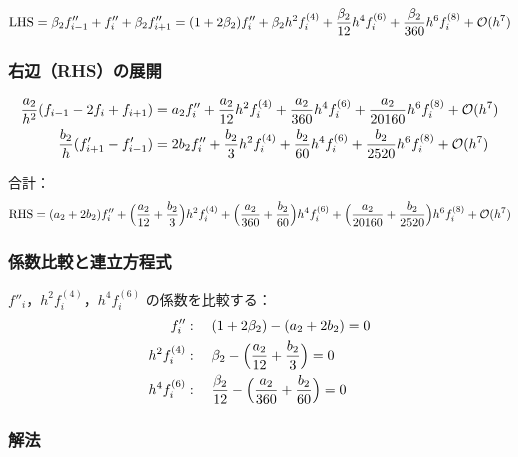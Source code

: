 \begin{equation}
  \text{LHS} = \beta_2 f''_{i-1} + f''_i + \beta_2 f''_{i+1}
  = (1+2\beta_2)f''_i + \beta_2 h^2 f^{(4)}_i
    + \frac{\beta_2}{12}h^4 f^{(6)}_i + \frac{\beta_2}{360}h^6 f^{(8)}_i + \mathcal{O}(h^7)
\end{equation}

\subsubsection*{右辺（RHS）の展開}

\begin{align}
  \frac{a_2}{h^2}(f_{i-1}-2f_i+f_{i+1})
  &= a_2 f''_i + \frac{a_2}{12}h^2 f^{(4)}_i + \frac{a_2}{360}h^4 f^{(6)}_i
     + \frac{a_2}{20160}h^6 f^{(8)}_i + \mathcal{O}(h^7) \\
  \frac{b_2}{h}(f'_{i+1}-f'_{i-1})
  &= 2b_2 f''_i + \frac{b_2}{3}h^2 f^{(4)}_i + \frac{b_2}{60}h^4 f^{(6)}_i
     + \frac{b_2}{2520}h^6 f^{(8)}_i + \mathcal{O}(h^7)
\end{align}

合計：
\begin{equation}
  \text{RHS} = (a_2+2b_2)f''_i
  + \Bigl(\frac{a_2}{12}+\frac{b_2}{3}\Bigr)h^2 f^{(4)}_i
  + \Bigl(\frac{a_2}{360}+\frac{b_2}{60}\Bigr)h^4 f^{(6)}_i
  + \Bigl(\frac{a_2}{20160}+\frac{b_2}{2520}\Bigr)h^6 f^{(8)}_i + \mathcal{O}(h^7)
\end{equation}

\subsubsection*{係数比較と連立方程式}

$f''_i$，$h^2 f^{(4)}_i$，$h^4 f^{(6)}_i$ の係数を比較する：
\begin{align}
  f''_i        &:\quad (1+2\beta_2) - (a_2+2b_2) = 0 \label{eq:app_II_eq1} \\
  h^2 f^{(4)}_i &:\quad \beta_2 - \Bigl(\frac{a_2}{12}+\frac{b_2}{3}\Bigr) = 0 \label{eq:app_II_eq2} \\
  h^4 f^{(6)}_i &:\quad \frac{\beta_2}{12} - \Bigl(\frac{a_2}{360}+\frac{b_2}{60}\Bigr) = 0 \label{eq:app_II_eq3}
\end{align}

\subsubsection*{解法}

